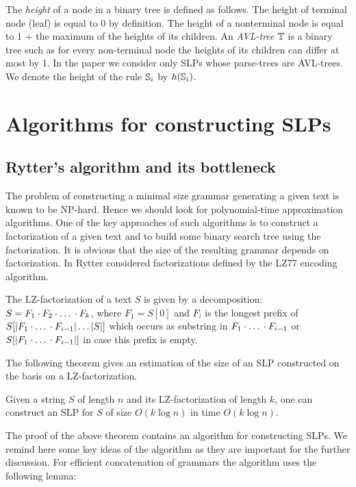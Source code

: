 ﻿\documentclass[10pt, conference, compsocconf]{IEEEtran}
\begin{document}
The \emph{height} of a node in a binary tree is defined as follows. The height
of terminal node (leaf) is equal to 0 by definition. The height of a
nonterminal node is equal to 1 + the maximum of the heights of its children. An
\emph{AVL-tree} $\mathbb{T}$ is a binary tree such as for every non-terminal node
the heights of its children can differ at most by 1. In the paper we consider
only SLPs whose parse-trees are AVL-trees. We denote the height of the rule
$\mathbb{S}_i$ by $h(\mathbb{S}_i)$.

\section{Algorithms for constructing SLPs}

\subsection{Rytter's algorithm and its bottleneck}

The problem of constructing a minimal size grammar generating a given text is
known to be NP-hard. Hence we should look for polynomial-time approximation
algorithms. One of the key approaches of such algorithms is to construct a
factorization of a given text and to build some binary search tree using the
factorization. It is obvious that the size of the resulting grammar depends on
factorization. In \cite{SLPConstruction} Rytter considered factorizations
defined by the LZ77 encoding algorithm.

\begin{definition}
The LZ-factorization of a text $S$ is given by a decomposition: $S = F_1 \cdot F_2 \cdot \mbox{\dots} \cdot F_k$, where
$F_1 = S[0]$ and $F_i$ is the longest prefix of $S[|F_1\cdot \mbox{\dots} \cdot F_{i-1}|\dots|S|]$ which occurs as
substring in $F_1 \cdot \mbox{\dots} \cdot F_{i-1}$ or $S[|F_1\cdot \mbox{\dots} \cdot F_{i-1}|]$ in case this prefix is
empty.
\end{definition}

The following theorem gives an estimation of the size of an SLP constructed on
the basis on a LZ-factorization.

\begin{thm}
Given a string $S$ of length $n$ and its LZ-factorization of length $k$, one
can construct an SLP for $S$ of size $O(k \log n)$ in time $O(k \log n)$.
\end{thm}

The proof of the above theorem contains an algorithm for constructing SLPs. We
remind here some key ideas of the algorithm as they are important for the
further discussion. For efficient concatenation of grammars the algorithm uses
the following lemma:
\end{document}

